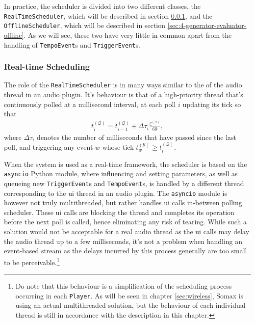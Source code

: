 In practice, the scheduler is divided into two different classes, the \texttt{RealTime\-Scheduler}, which will be described in section \ref{sec:4-generator-evaluator-rt}, and the \texttt{OfflineScheduler}, which will be described in section \ref{sec:4-generator-evaluator-offline}. As we will see, these two have very little in common apart from the handling of \texttt{TempoEvent}s and \texttt{TriggerEvent}s.

\subsubsection{Real-time Scheduling}\label{sec:4-generator-evaluator-rt}
The role of the \texttt{RealTimeScheduler} is in many ways similar to the of the audio thread in an audio plugin. It's behaviour is that of a high-priority thread that's continuously polled at a millisecond interval, at each poll $i$ updating its tick so that 
\begin{align}
	t_i^{(\mathcal Q)} = t_{i-1}^{(\mathcal Q)} + \Delta \tau_i \frac {\zeta^{(\mathcal Q)}}{60},
\end{align}
where $\Delta \tau_i$ denotes the number of milliseconds that have passed since the last poll, and triggering any event $w$ whose tick $t^{(\mathcal Y)}_w \ge t^{(\mathcal Q)}_i$.

When the system is used as a real-time framework, the scheduler is based on the \texttt{asyncio} Python module, where influencing and setting parameters, as well as queueing new \texttt{TriggerEvent}s and \texttt{TempoEvent}s, is handled by a different thread corresponding to the ui thread in an audio plugin. The \texttt{asyncio} module is however not truly multithreaded, but rather handles ui calls in-between polling scheduler. These ui calls are blocking the thread and completes its operation before the next poll is called, hence eliminating any risk of tearing. While such a solution would not be acceptable for a real audio thread as the ui calls may delay the audio thread up to a few milliseconds, it's not a problem when handling an event-based stream as the delays incurred by this process generally are too small to be perceivable.\footnote{Do note that this behaviour is a simplification of the scheduling process occurring in each \texttt{Player}. As will be seen in chapter \ref{sec:wireless}, Somax is using an actual multithreaded solution, but the behaviour of each individual thread is still in accordance with the description in this chapter.}

